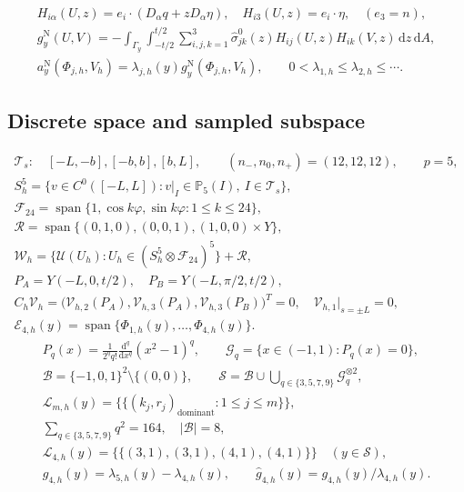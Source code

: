 \begin{gather}
 H_{i\alpha}(U,z)=e_i\cdot(D_\alpha q+zD_\alpha\eta),\quad
 H_{i3}(U,z)=e_i\cdot\eta,\quad(e_3=n),\\
 g_y^{\mathrm N}(U,V)=-\int_{\Gamma_y}\int_{-t/2}^{t/2}
 \sum_{i,j,k=1}^3\widehat\sigma^0_{jk}(z)H_{ij}(U,z)H_{ik}(V,z)
 \,\mathrm{d}z\,\mathrm{d}A,\\
 a_y^{\mathrm N}(\Phi_{j,h},V_h)=\lambda_{j,h}(y)g_y^{\mathrm N}(\Phi_{j,h},V_h),
 \qquad0<\lambda_{1,h}\le\lambda_{2,h}\le\cdots .
 \label{eq:experiment-pencil}
\end{gather}

\subsection{Discrete space and sampled subspace}
\begin{gather}
 \mathcal T_s:\quad[-L,-b],[-b,b],[b,L],\qquad
 (n_-,n_0,n_+)=(12,12,12),\qquad p=5,\\
 S_h^5=\{v\in C^0([-L,L]):v|_I\in\mathbb P_5(I),\ I\in\mathcal T_s\},\\
 \mathcal F_{24}=\operatorname{span}\{1,\cos k\varphi,\sin k\varphi:1\le k\le24\},\\
 \mathcal R=\operatorname{span}\{(0,1,0),(0,0,1),(1,0,0)\mathbin\times Y\},\\
 \mathcal W_h=\{\mathcal U(U_h):U_h\in(S_h^5\otimes\mathcal F_{24})^5\}+\mathcal R,\\
 P_A=Y(-L,0,t/2),\quad P_B=Y(-L,\pi/2,t/2),\\
 C_h\mathcal V_h=
 \bigl(\mathcal V_{h,2}(P_A),\mathcal V_{h,3}(P_A),\mathcal V_{h,3}(P_B)\bigr)^T=0,
 \quad\mathcal V_{h,1}|_{s=\pm L}=0,\\
 \mathcal E_{4,h}(y)=\operatorname{span}\{\Phi_{1,h}(y),\ldots,\Phi_{4,h}(y)\}.
\end{gather}
\begin{gather}
 P_q(x)=\frac{1}{2^q q!}\frac{\mathrm d^q}{\mathrm dx^q}(x^2-1)^q,\qquad
 \mathcal G_q=\{x\in(-1,1):P_q(x)=0\},\\
 \mathcal B=\{-1,0,1\}^2\setminus\{(0,0)\},\qquad
 \mathcal S=\mathcal B\cup\bigcup_{q\in\{3,5,7,9\}}\mathcal G_q^{\otimes2},\\
 \mathcal L_{m,h}(y)=\{\!\{(k_j,r_j)_{\mathrm{dominant}}:1\le j\le m\}\!\},\\
 \sum_{q\in\{3,5,7,9\}}q^2=164,\quad |\mathcal B|=8,\\
 \mathcal L_{4,h}(y)=\{\!\{(3,1),(3,1),(4,1),(4,1)\}\!\}\quad(y\in\mathcal S),\\
 g_{4,h}(y)=\lambda_{5,h}(y)-\lambda_{4,h}(y),\qquad
 \widehat g_{4,h}(y)=g_{4,h}(y)/\lambda_{4,h}(y).
\end{gather}
